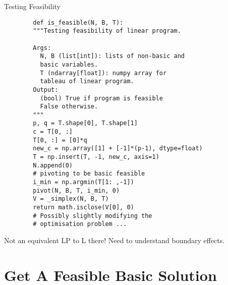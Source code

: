 \documentclass[32pt, aspectratio = 169]{beamer}
\begin{document}
\begin{frame}[fragile]{Testing Feasibility}
  \begin{overlayarea}{1.05\textwidth}{.6\textheight}
  \setlength\columnseprule{.1pt}
  \begin{multicols}{2}
    \scriptsize{
      \begin{verbatim}
        def is_feasible(N, B, T):
        """Testing feasibility of linear program.

        Args:
          N, B (list[int]): lists of non-basic and
          basic variables.
          T (ndarray[float]): numpy array for
          tableau of linear program.
        Output:
          (bool) True if program is feasible
          False otherwise.
        """
        p, q = T.shape[0], T.shape[1]
        c = T[0, :]
        T[0, :] = [0]*q
        new_c = np.array([1] + [-1]*(p-1), dtype=float)
        T = np.insert(T, -1, new_c, axis=1)
        N.append(0)
        # pivoting to be basic feasible
        i_min = np.argmin(T[1: ,-1])
        pivot(N, B, T, i_min, 0)
        V = _simplex(N, B, T)
        return math.isclose(V[0], 0)
        # Possibly slightly modifying the
        # optimisation problem ...
      \end{verbatim}
    }
  \end{multicols}
\end{overlayarea}
\pause
  \begin{tcolorbox}[
    enhanced,
    parbox = false,
    colback = mLightBrown!30!white,
    colframe = mLightBrown!30!white,
    arc = 0mm,
    ]
    Not an equivalent LP to L there! Need to understand boundary effects.
  \end{tcolorbox}
\end{frame}

\section{Get A Feasible Basic Solution}
\end{document}
